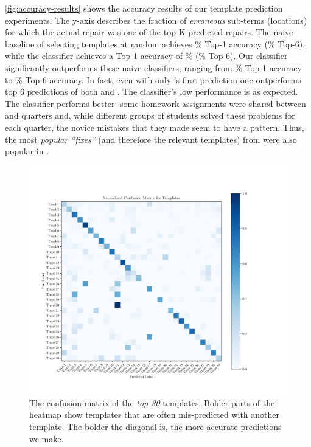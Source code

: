 %
\autoref{fig:accuracy-results} shows the accuracy results of our template
prediction experiments. The y-axis describes the fraction of \emph{erroneous}
sub-terms (locations) for which the actual repair was one of the top-K predicted
repairs.
%
The naive baseline of selecting templates at random achieves
\RandomTopOne\% Top-1 accuracy (\RandomTopSix\% Top-6), while
the \popular classifier achieves a Top-1 accuracy of \PopularTopOne\%
(\PopularTopSix\% Top-6).
%
Our \dnn classifier significantly outperforms these naive classifiers, ranging
from \DnnTopOne\% Top-1 accuracy to \DnnTopSix\% Top-6 accuracy.
%
In fact, even with only \dnn's first prediction one outperforms top 6
predictions of both \random and \popular.
%
The \random classifier's low performance is as expected.
%
The \popular classifier performs better: some homework assignments were shared
between \SPRING and \FALL quarters and, while different groups of students
solved these problems for each quarter, the novice mistakes that they made seem
to have a pattern. Thus, the most \emph{popular ``fixes''} (and therefore the
relevant templates) from \SPRING were also popular in \FALL.



\begin{figure}[t]
  \centering
  \includegraphics[trim={30 40 100 70},clip,width=\linewidth]{evaluation-conf-matrix.pdf}
  \caption{The confusion matrix of the \emph{top 30} templates. Bolder parts of
  the heatmap show templates that are often mis-predicted with another template.
  The bolder the diagonal is, the more accurate predictions we make.}
  \label{fig:conf-matrix}
\end{figure}

